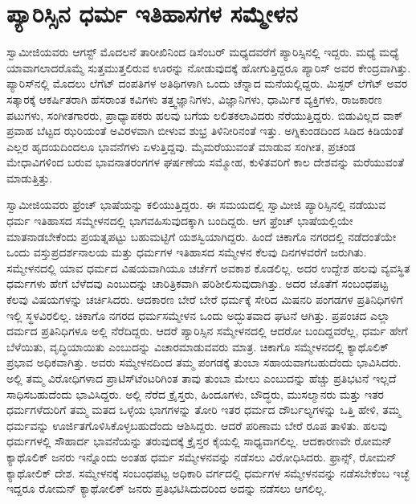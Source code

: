 
\chapter{ಪ್ಯಾರಿಸ್ಸಿನ ಧರ್ಮ ಇತಿಹಾಸಗಳ ಸಮ್ಮೇಳನ }

 ಸ್ವಾಮೀಜಿಯವರು ಆಗಸ್ಟ್ ಮೊದಲನೆ ತಾರೀಖಿನಿಂದ ಡಿಸೆಂಬರ್ ಮಧ್ಯದವರೆಗೆ ಪ್ಯಾರಿಸ್ಸಿನಲ್ಲಿ ಇದ್ದರು. ಮಧ್ಯೆ ಮಧ್ಯೆ ಯಾವಾಗಲಾದರೊಮ್ಮೆ ಸುತ್ತಮುತ್ತಲಿರುವ ಊರನ್ನು ನೋಡುವುದಕ್ಕೆ ಹೋಗುತ್ತಿದ್ದರೂ ಪ್ಯಾರಿಸ್ ಅವರ ಕೇಂದ್ರವಾಗಿತ್ತು. ಪ್ಯಾರಿಸ್‍ನಲ್ಲಿ ಮೊದಲು ಲೆಗೆಟ್ ದಂಪತಿಗಳ ಅತಿಥಿಗಳಾಗಿ ಒಂದು ಚೆನ್ನಾದ ಮನೆಯಲ್ಲಿದ್ದರು. ಮಿಸ್ಟರ್ ಲೆಗೆಟ್ ಅವರ ಸತ್ಕಾರಕ್ಕೆ ಆಕರ್ಷಿತರಾಗಿ ಹೆಸರಾಂತ ಕವಿಗಳು ತತ್ತ್ವಜ್ಞಾನಿಗಳು, ವಿಜ್ಞಾನಿಗಳು, ಧಾರ್ಮಿಕ ವ್ಯಕ್ತಿಗಳು, ರಾಜಕಾರಣ ಪಟುಗಳು, ಸಂಗೀತಗಾರರು, ಪ್ರಾಧ್ಯಾಪಕರು ಹಲವು ಬಗೆಯ ಲಲಿತಕಲಾವಿದರು ನೆರೆಯುತ್ತಿದ್ದರು. ಬಿಡುವಿಲ್ಲದ ವಾಕ್ ಪ್ರವಾಹ ಬೆಟ್ಟದ ಝರಿಯಂತೆ ಅವಿರಳವಾಗಿ ಬೀಳುವ ಶುಭ್ರ ತಿಳಿನೀರಿನಂತೆ ಇತ್ತು. ಅಗ್ನಿಕುಂಡದಿಂದ ಸಿಡಿದ ಕಿಡಿಯಂತೆ ಎಲ್ಲರ ಹೃದಯದಿಂದಲೂ ಭಾವನೆಗಳು ಏಳುತ್ತಿದ್ದವು. ಮೈಮರೆಯುವಂತೆ ಮಾಡುವ ಸಂಗೀತ, ಪ್ರಚಂಡ ಮೇಧಾವಿಗಳಿಂದ ಬರುವ ಭಾವನಾತರಂಗಗಳ ಘರ್ಷಣೆಯ ಸಮ್ಮೋಹ, ಕುಳಿತವರಿಗೆ ಕಾಲ ದೇಶವನ್ನು ಮರೆಯುವಂತೆ ಮಾಡುತ್ತಿತ್ತು. 

 ಸ್ವಾಮೀಜಿಯವರು ಫ್ರೆಂಚ್ ಭಾಷೆಯನ್ನು ಕಲಿಯುತ್ತಿದ್ದರು. ಈ ಸಮಯದಲ್ಲಿ ಸ್ವಾಮೀಜಿ ಪ್ಯಾರಿಸ್ಸಿನಲ್ಲಿ ನಡೆಯುವ ಧರ್ಮ ಇತಿಹಾಸದ ಸಮ್ಮೇಳನದಲ್ಲಿ ಭಾಗವಹಿಸುವುದಕ್ಕಾಗಿ ಬಂದಿದ್ದರು. ಆಗ ಫ್ರೆಂಚ್ ಭಾಷೆಯಲ್ಲಿಯೇ ಮಾತನಾಡಬೇಕೆಂದು ಪ್ರಯತ್ನಪಟ್ಟು ಬಹುಮಟ್ಟಿಗೆ ಯಶಸ್ವಿಯಾಗಿದ್ದರು. ಹಿಂದೆ ಚಿಕಾಗೊ ನಗರದಲ್ಲಿ ನಡೆದಂತೆಯೇ ಒಂದು ವಸ್ತುಪ್ರದರ್ಶನಾಲಯ ಮತ್ತು ಧರ್ಮಗಳ ಇತಿಹಾಸದ ಸಮ್ಮೇಳನ ಕೆಲವು ದಿನಗಳವರೆಗೆ ಜರುಗಿತು. ಸಮ್ಮೇಳನದಲ್ಲಿ ಯಾವ ಧರ್ಮದ ವಿಷಯವಾಗಿಯೂ ಚರ್ಚೆಗೆ ಅವಕಾಶ ಕೊಡಲಿಲ್ಲ. ಅದರ ಉದ್ದೇಶ ಹಲವು ವ್ಯವಸ್ಥಿತ ಧರ್ಮಗಳು ಹೇಗೆ ಬೆಳೆದವು ಎಂಬುದನ್ನು ಚಾರಿತ್ರಿಕವಾಗಿ ಪರಿಶೀಲಿಸುವುದಾಗಿತ್ತು. ಅದರ ಜೊತೆಗೆ ಸಂಬಂಧಪಟ್ಟ ಕೆಲವು ವಿಷಯಗಳನ್ನು ಚರ್ಚಿಸಿದರು. ಆದಕಾರಣ ಬೇರೆ ಬೇರೆ ಧರ್ಮಕ್ಕೆ ಸೇರಿದ ಮಿಷನರಿ ಪಂಗಡಗಳ ಪ್ರತಿನಿಧಿಗಳಿಗೆ ಇಲ್ಲಿ ಸ್ಥಳವಿರಲಿಲ್ಲ. ಚಿಕಾಗೊ ನಗರದ ಧರ್ಮಸಮ್ಮೇಳನ ಒಂದು ಅದ್ಭುತವಾದ ಘಟನೆ ಆಗಿತ್ತು. ಪ್ರಪಂಚದ ಎಲ್ಲಾ ದರ್ಮದ ಪ್ರತಿನಿಧಿಗಳೂ ಅಲ್ಲಿ ನೆರೆದಿದ್ದರು. ಆದರೆ ಪ್ಯಾರಿಸ್ಸಿನ ಸಮ್ಮೇಳನದಲ್ಲಿ ಆದರೋ ಬಂದಿದ್ದವರೆಲ್ಲ, ಧರ್ಮ ಹೇಗೆ ಬೆಳೆಯಿತು, ವೃದ್ಧಿಯಾಯಿತು ಎಂಬುದನ್ನು ವಿಚಾರಮಾಡುವವರು ಮಾತ್ರ. ಚಿಕಾಗೊ ಸಮ್ಮೇಳನದಲ್ಲಿ ಕ್ಯಾಥೊಲಿಕ್ ಪ್ರಭಾವ ಅಧಿಕವಾಗಿತ್ತು. ಅವರು ಸಮ್ಮೇಳನದಿಂದ ತಮ್ಮ ಪಂಗಡಕ್ಕೆ ತುಂಬಾ ಸಹಾಯವಾಗಬಹುದೆಂದು ಭಾವಿಸಿದರು. ಅಲ್ಲಿ ತಮ್ಮ ವಿರೋಧಿಗಳಾದ ಪ್ರಾಟಿಸ್‍ಟೆಂಟರಿಗಿಂತ ತಾವು ತುಂಬಾ ಮೇಲು ಎಂಬುದನ್ನು ಹೆಚ್ಚು ಪ್ರತಿಭಟನೆ ಇಲ್ಲದೆ ಸಾಧಿಸಬಹುದೆಂದು ಭಾವಿಸಿದ್ದರು. ಅಲ್ಲಿ ನೆರೆದ ಕ್ರೈಸ್ತರು, ಹಿಂದೂಗಳು, ಬೌದ್ಧರು, ಮುಸಲ್ಮಾನರು ಮತ್ತು ಇತರ ಧರ್ಮಗಳೆದುರಿಗೆ ತಮ್ಮ ಮತದ ಒಳ್ಳೆಯ ಭಾಗಗಳನ್ನು ತೋರಿ ಇತರ ಧರ್ಮದ ದೌರ್ಬಲ್ಯಗಳನ್ನು ಒತ್ತಿ ಹೇಳಿ, ತಮ್ಮ ಧರ್ಮವನ್ನು ಊರ್ಜಿತಗೊಳಿಸಿಕೊಳ್ಳಬಹುದೆಂದು ಆಶಿಸಿದ್ದರು. ಆದರೆ ಪರಿಣಾಮ ಬೇರೆ ರೂಪ ತಾಳಿತು. ಹಲವು ಧರ್ಮಗಳಲ್ಲಿ ಸೌಹಾರ್ದ ಭಾವನೆಯನ್ನು ತರುವುದಕ್ಕೆ ಕ್ರೈಸ್ತರ ಕೈಯಲ್ಲಿ ಸಾಧ್ಯವಾಗಲಿಲ್ಲ. ಆದಕಾರಣವೇ ರೋಮನ್ ಕ್ಯಾಥೊಲಿಕ್ ಜನರು ಇನ್ನೊಂದು ಅಂತಹ ಧರ್ಮ ಸಮ್ಮೇಳನವನ್ನು ನಡೆಸಲು ವಿರೋಧಿಸಿದರು. ಫ್ರಾನ್ಸ್, ರೋಮನ್ ಕ್ಯಾಥೋಲಿಕ್ ದೇಶ. ಸಮ್ಮೇಳನಕ್ಕೆ ಸಂಬಂಧಪಟ್ಟ ಅಧಿಕಾರಿ ವರ್ಗದಲ್ಲಿ ಧರ್ಮಗಳ ಸಮ್ಮೇಳನವನ್ನು ನಡೆಸಬೇಕೆಂಬ ಇಚ್ಛೆ ಇದ್ದರೂ ರೋಮನ್ ಕ್ಯಾಥೋಲಿಕ್ ಜನರು ಪ್ರತಿಭಟಿಸಿದುದರಿಂದ ಅದನ್ನು ನಡೆಸಲು ಆಗಲಿಲ್ಲ. 

